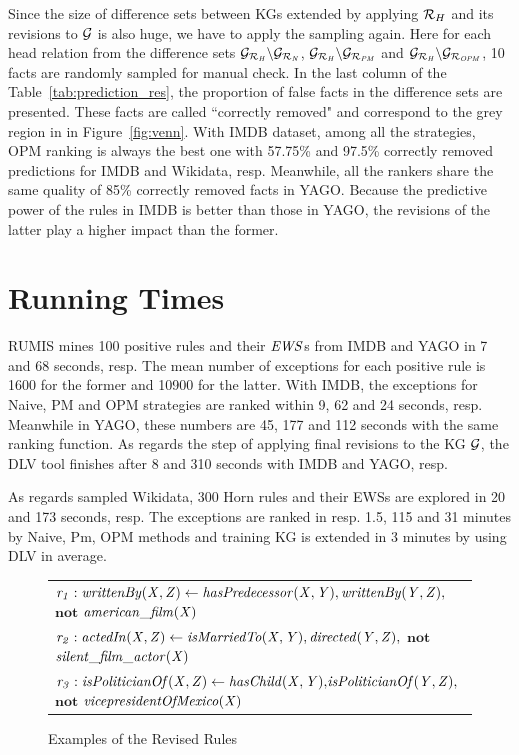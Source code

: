 Since the size of difference sets between KGs extended by applying $\mathcal{R}_H$ and its revisions to $\mathcal{G}$ is also huge, we have to apply the sampling again. Here for each head relation from the difference sets $\mathcal{G}_{\mathcal{R}_{\mathit{H}}}\backslash \mathcal{G}_{\mathcal{R}_{\mathit{N}}}$, $\mathcal{G}_{\mathcal{R}_{\mathit{H}}}\backslash \mathcal{G}_{\mathcal{R}_{\mathit{PM}}}$ and $\mathcal{G}_{\mathcal{R}_{\mathit{H}}}\backslash \mathcal{G}_{\mathcal{R}_{\mathit{OPM}}}$, 10 facts are randomly sampled for manual check. In the last column of the Table~\ref{tab:prediction_res}, the proportion of false facts in the difference sets are presented. These facts are called ``correctly removed" and correspond to the grey region in in Figure~\ref{fig:venn}. With IMDB dataset, among all the strategies, OPM ranking is always the best one with 57.75\% and 97.5\% correctly removed predictions for IMDB and Wikidata, resp. Meanwhile, all the rankers share the same quality of 85\% correctly removed facts in YAGO. Because the predictive power of the rules in IMDB is better than those in YAGO, the revisions of the latter play a higher impact than the former.

\section{Running Times}

RUMIS mines 100 positive rules and their $\mathit{EWS}$s from IMDB and YAGO in 7 and 68 seconds, resp. The mean number of exceptions for each positive rule is 1600 for the former and 10900 for the latter. With IMDB, the exceptions for Naive, PM and OPM strategies are ranked within 9, 62 and 24 seconds, resp. Meanwhile in YAGO, these numbers are 45, 177 and 112 seconds with the same ranking function. As regards the step of applying final revisions to the KG $\mathcal{G}$, the DLV tool finishes after 8 and 310 seconds with IMDB and YAGO, resp.

As regards sampled Wikidata, 300 Horn rules and their EWSs are explored in 20 and 173 seconds, resp. The exceptions are ranked in resp. 1.5, 115 and 31 minutes by Naive, Pm, OPM methods and training KG is extended in 3 minutes by using DLV in average.

\begin{figure}[t]
    \centering
   
    \vspace{-.2cm}
    \begin{tabular}{l}
 {\scriptsize
        $\mathit{r_1: writtenBy(X, Z)}  \leftarrow
        \mathit{hasPredecessor(X, Y)},\mathit{writtenBy(Y, Z)},$ $ \textbf{not}$  $\mathit{american\_film(X)} $}\\        
       {\scriptsize 
$\mathit{r_2:  actedIn(X, Z)}  \leftarrow
        \mathit{isMarriedTo(X, Y)},\mathit{directed(Y, Z)},$ $ \textbf{not}$  $\mathit{silent\_film\_actor(X)} $} \\
          {\scriptsize 
$\mathit{r_3:  isPoliticianOf(X, Z)}  \leftarrow
        \mathit{hasChild(X, Y)}{,}\mathit{isPoliticianOf(Y, Z)}{,}$$ \textbf{not}$  $\mathit{vicepresidentOfMexico(X)} $} \\
 \end{tabular}            
    \caption{Examples of the Revised Rules}
 \label{fig:examplerules}
 \vspace{-.4cm}
\end{figure}

